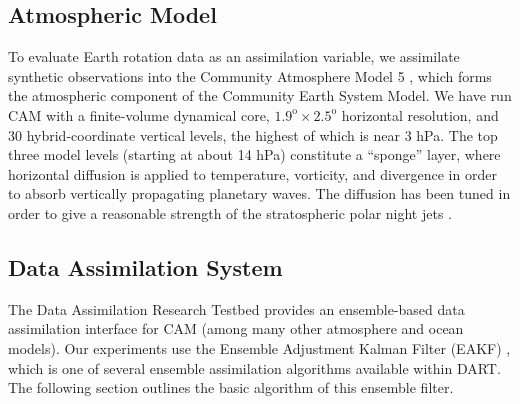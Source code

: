 \subsection{Atmospheric Model}
\label{sec:CAM}
To evaluate Earth rotation data as an assimilation variable, we assimilate synthetic observations into the Community Atmosphere Model 5 \citep[CAM5]{nealeetal2010}, which forms the atmospheric component of the Community Earth System Model. 
We have run CAM with a finite-volume dynamical core, $1.9^{\text{o}} \times 2.5^{\text{o}}$ horizontal resolution, and  30 hybrid-coordinate vertical levels, the highest of which is near 3 hPa.
The top three model levels (starting at about 14 hPa) constitute a ``sponge'' layer, where horizontal diffusion is applied to temperature, vorticity, and divergence in order to absorb vertically propagating planetary waves.  
The diffusion has been tuned in order to give a reasonable strength of the stratospheric polar night jets \citep{nealeetal2010}.



\subsection{Data Assimilation System}
\label{sec:DAS}
The Data Assimilation Research Testbed  \citep[DART]{Anderson2009, Raeder2012} provides an ensemble-based data assimilation interface for CAM (among many other atmosphere and ocean models). 
Our experiments use the Ensemble Adjustment Kalman Filter (EAKF) \citep{anderson2001}, which is one of several ensemble assimilation algorithms available within DART.
The following section outlines the basic algorithm of this ensemble filter.

